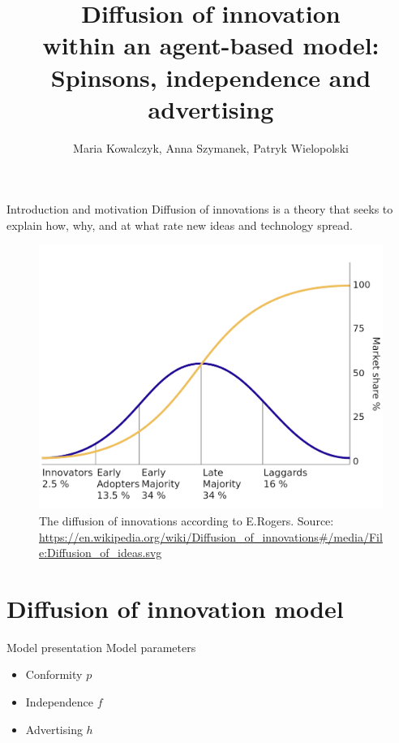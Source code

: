 \documentclass[10pt]{beamer}
\title{Diffusion of innovation \\ within an agent-based model: \\ Spinsons, independence and advertising}
\author{Maria Kowalczyk, Anna Szymanek, Patryk Wielopolski}
\institute{Wrocław Univeristy of Technology and Science}
\date{}
\begin{document}
\maketitle

\begin{frame}{Introduction and motivation}
	Diffusion of innovations is a theory that seeks to explain how, why, and at what rate new ideas and technology spread.
	
	\begin{figure}
		\includegraphics[height=0.5\textheight]{../resources/images/Diffusion_of_ideas.png}
		\caption{The diffusion of innovations according to E.Rogers. Source: \url{https://en.wikipedia.org/wiki/Diffusion\_of\_innovations\#/media/File:Diffusion\_of\_ideas.svg}}
	\end{figure}
	\nocite{article}
\end{frame}{}

\section{Diffusion of innovation model}

\begin{frame}{Model presentation}
	Model parameters
	\begin{itemize}
		\item Conformity $p$
		\item Independence $f$
		\item Advertising $h$
	\end{itemize}
\end{frame}
\end{document}
